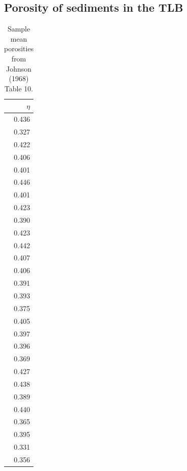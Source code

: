 \subsection{Porosity of sediments in the TLB}


\bgroup

\renewcommand{\arraystretch}{1.0}

\setlength{\tabcolsep}{1.0em}

\begin{table}[H]
	\caption{Sample mean porosities from Johnson (1968) Table 10.}
	
	\centering
	
	\begin{tabular}{r}
		$\eta$\\
		\hline
		0.436\\
		0.327\\
		0.422\\
		0.406\\
		0.401\\
		0.446\\
		0.401\\
		0.423\\
		0.390\\
		0.423\\
		0.442\\
		0.407\\
		0.406\\
		0.391\\
		0.393\\
		0.375\\
		0.405\\
		0.397\\
		0.396\\
		0.369\\
		0.427\\
		0.438\\
		0.389\\
		0.440\\
		0.365\\
		0.395\\
		0.331\\
		0.356\\
	\end{tabular}
	
	\label{ap_b_porosity_boot}
\end{table}

\egroup

